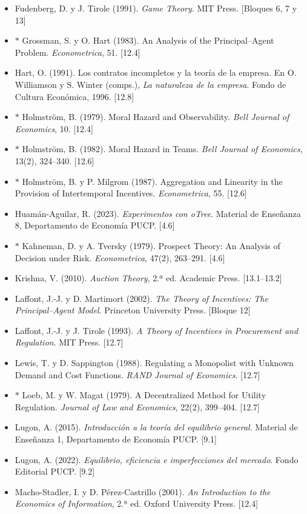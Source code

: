 \documentclass[11pt,a4paper]{article}
\begin{document}
{\begin{itemize}[leftmargin=1.4em,itemsep=1pt,label={}]
\item Fudenberg, D. y J. Tirole (1991). \emph{Game Theory}. MIT Press. [Bloques 6, 7 y 13]
\item $\ast$ Grossman, S. y O. Hart (1983). An Analysis of the Principal--Agent Problem. \emph{Econometrica}, 51. [12.4]
\item Hart, O. (1991). Los contratos incompletos y la teoría de la empresa. En O. Williamson y S. Winter (comps.), \emph{La naturaleza de la empresa}. Fondo de Cultura Económica, 1996. [12.8]
\item $\ast$ Holmström, B. (1979). Moral Hazard and Observability. \emph{Bell Journal of Economics}, 10. [12.4]
\item $\ast$ Holmström, B. (1982). Moral Hazard in Teams. \emph{Bell Journal of Economics}, 13(2), 324--340. [12.6]
\item $\ast$ Holmström, B. y P. Milgrom (1987). Aggregation and Linearity in the Provision of Intertemporal Incentives. \emph{Econometrica}, 55. [12.6]
\item Huamán-Aguilar, R. (2023). \emph{Experimentos con oTree}. Material de Enseñanza 8, Departamento de Economía PUCP. [4.6]
\item $\ast$ Kahneman, D. y A. Tversky (1979). Prospect Theory: An Analysis of Decision under Risk. \emph{Econometrica}, 47(2), 263--291. [4.6]
\item Krishna, V. (2010). \emph{Auction Theory}, 2.ª ed. Academic Press. [13.1--13.2]
\item Laffont, J.-J. y D. Martimort (2002). \emph{The Theory of Incentives: The Principal--Agent Model}. Princeton University Press. [Bloque 12]
\item Laffont, J.-J. y J. Tirole (1993). \emph{A Theory of Incentives in Procurement and Regulation}. MIT Press. [12.7]
\item Lewis, T. y D. Sappington (1988). Regulating a Monopolist with Unknown Demand and Cost Functions. \emph{RAND Journal of Economics}. [12.7]
\item $\ast$ Loeb, M. y W. Magat (1979). A Decentralized Method for Utility Regulation. \emph{Journal of Law and Economics}, 22(2), 399--404. [12.7]
\item Lugon, A. (2015). \emph{Introducción a la teoría del equilibrio general}. Material de Enseñanza 1, Departamento de Economía PUCP. [9.1]
\item Lugon, A. (2022). \emph{Equilibrio, eficiencia e imperfecciones del mercado}. Fondo Editorial PUCP. [9.2]
\item Macho-Stadler, I. y D. Pérez-Castrillo (2001). \emph{An Introduction to the Economics of Information}, 2.ª ed. Oxford University Press. [12.4]

\end{itemize}}
\end{document}
